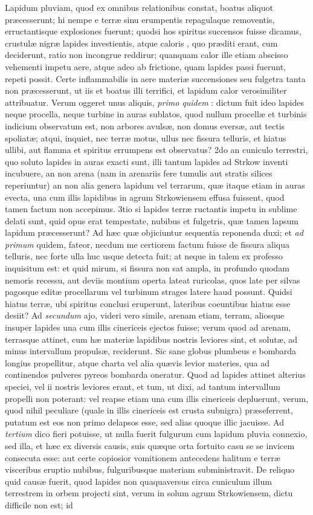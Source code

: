 \documentclass[a4paper, 11pt, oneside, polutonikogreek, latin]{article}
\begin{document}
Lapidum pluviam, quod ex omnibus relationibus constat, boatus aliquot præcesserunt; hi nempe e terræ sinu erumpentis repagulaque removentis, erructantisque explosiones fuerunt; quodsi hos spiritus succensos fuisse dicamus, crustulæ nigræ lapides investientis, atque caloris , quo præditi erant, cum deciderunt, ratio non incongrue reddirur; quanquam calor ille etiam abscisso vehementi impetu aere, atque adeo ab frictione, quam lapides passi fuerunt, repeti possit. Certe inflammabilis in aere materiæ succensiones seu fulgetra tanta non præcesserunt, ut iis et boatus illi terrifici, et lapidum calor verosimiliter attribuatur. Verum oggeret unus aliquis, \emph{primo quidem} : dictum fuit ideo lapides neque procella, neque turbine in auras sublatos, quod nullum procellæ et turbinis indicium observatum est, non arbores avulsæ, non domus eversæ, aut tectis spoliatæ; atqui, inquiet, nec terræ motus, ullus nec fissura telluris, et hiatus ullibi, aut flamma et spiritus errumpens est observatus? 2do an cuniculo terrestri, quo soluto lapides in auras exacti sunt, illi tantum lapides ad Strkow inventi incubuere, an non arena (nam in arenariis fere tumulis aut stratis silices reperiuntur) an non alia genera lapidum vel terrarum, quæ itaque etiam in auras evecta, una cum illis lapidibus in agrum Strkowiensem effusa fuissent, quod tamen factum non accepimus. 3tio si lapides terræ ructantis impetu in sublime delati sunt, quid opus erat tempestate, nubibus et fulgetris, quæ tamen lapsum lapidum præcesserunt? Ad hæc quæ objiciuntur sequentia reponenda duxi; et \emph{ad primum} quidem, fateor, necdum me certiorem factum fuisse de fissura aliqua telluris, nec forte ulla huc usque detecta fuit; at neque in talem ex professo inquisitum est: et quid mirum, si fissura non sat ampla, in profundo quodam nemoris recessu, aut deviis montium operta lateat ruricolas, quos late per silvas pagosque editæ procellarum vel turbinum strages latere haud possunt. Quidsi hiatus terræ, ubi spiritus conclusi eruperunt, lateribus coeuntibus hiatus esse desiit? Ad \emph{secundum} ajo, videri vero simile, arenam etiam, terram, aliosque insuper lapides una cum illis cinericeis ejectos fuisse; verum quod ad arenam, terrasque attinet, cum hæ materiæ lapidibus nostris leviores sint, et solutæ, ad minus intervallum propulsæ, reciderunt. Sic sane globus plumbeus e bombarda longius propellitur, atque charta vel alia quævis levior materies, qua ad continendos pulveres pyreos bombarda oneratur. Quod ad lapides attinet alterius speciei, vel ii nostris leviores erant, et tum, ut dixi, ad tantum intervallum propelli non poterant: vel reapse etiam una cum illis cinericeis depluerunt, verum, quod nihil peculiare (quale in illis cinericeis est crusta subnigra) præseferrent, putatum est eos non primo delapsos esse, sed alias quoque illic jacuisse. Ad \emph{tertium} dico fieri potuisse, ut nulla fuerit fulgurum cum lapidum pluvia connexio, sed illa, et hæc ex diversis causis, suis quæque orta fortuito casu se se invicem consecuta esse: aut certe copiosior vomitionem antecedens halitum e terræ visceribus eruptio nubibus, fulguribusque materiam subministravit. De reliquo quid causæ fuerit, quod lapides non quaquaversus circa cuniculum illum terrestrem in orbem projecti sint, verum in solum agrum Strkowiensem, dictu difficile non est; id 
\end{document}
